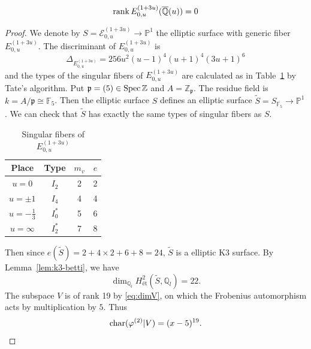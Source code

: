 \documentclass[main]{subfiles}
\begin{document}
\begin{thm}
    \begin{equation*}
        \operatorname{rank} E_{0,u}^{(1 + 3u)}(\overline{\mathbb{Q}}(u)) = 0
    \end{equation*}
\end{thm}
\begin{proof}
    We denote by $S=\mathcal{E}_{0,u}^{(1 + 3u)} \to \mathbb{P}^1$ the elliptic surface with generic fiber $E_{0,u}^{(1 + 3u)}$.
    The discriminant of $E_{0,u}^{(1 + 3u)}$ is
    \begin{equation*}
        \Delta_{E_{0,u}^{(1 + 3u)}} = 256 u^2 (u - 1)^4 (u + 1)^4 (3u + 1)^6
    \end{equation*}
    and the types of the singular fibers of $E_{0,u}^{(1 + 3u)}$ are calculated as in Table~\ref{tab:E_{0,u}^{(1 + 3u)}} by Tate's algorithm.
    Put $\mathfrak{p}=(5) \in \operatorname{Spec} \mathbb{Z}$ and $A = \mathbb{Z}_{\mathfrak{p}}$.
    The residue field is $k=A/\mathfrak{p} \cong \mathbb{F}_{5}$.
    Then the elliptic surface $S$ defines an elliptic surface $\tilde{S} = S_{\overline{\mathbb{F}_{5}}} \to \mathbb{P}^1$.
    We can check that $\tilde{S}$ has exactly the same types of singular fibers as $S$.

    \begin{table}[H]
        \centering
        \caption{Singular fibers of $E_{0,u}^{(1 + 3u)}$}
        \begin{tabular}{|c|c|c|c|}
            \hline
            Place            & Type    & $m_v$ & $e$ \\
            \hline
            $u=0$            & $I_2$   & 2     & 2   \\
            $u=\pm 1$        & $I_4$   & 4     & 4   \\
            $u=-\frac{1}{3}$ & $I_0^*$ & 5     & 6   \\
            $u=\infty$       & $I_2^*$ & 7     & 8   \\
            \hline
        \end{tabular}
        \label{tab:E_{0,u}^{(1 + 3u)}}
    \end{table}
    Then since $e(\tilde{S})=2+4 \times2+6+8=24$, $\tilde{S}$ is a elliptic K3 surface.
    By Lemma~\ref{lem:k3-betti}, we have
    \begin{equation*}
        \dim_{\mathbb{Q}_{l}} H_{\text{\'et}}^{2}(\tilde{S}, \mathbb{Q}_{l}) = 22.
    \end{equation*}
    The subspace $V$ is of rank 19 by \eqref{eq:dimV}, on which the Frobenius automorphism acts by multiplication by $5$.
    Thus
    \begin{equation*}
        \operatorname{char} (\varphi^{(2)} | V) = (x - 5)^{19}.
    \end{equation*}


\end{proof}
\end{document}
